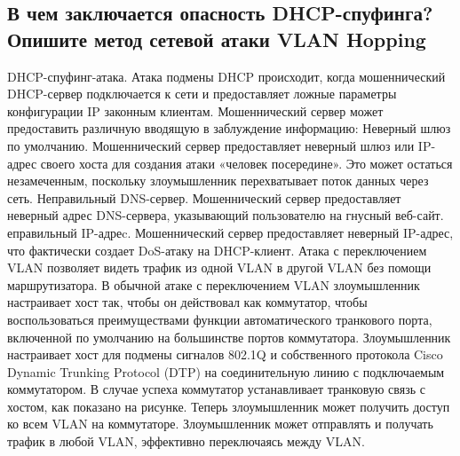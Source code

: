 \subsection{В чем заключается опасность DHCP-спуфинга? Опишите метод сетевой атаки VLAN Hopping}

DHCP-спуфинг-атака.
Атака подмены DHCP происходит, когда мошеннический DHCP-сервер подключается к сети и предоставляет ложные параметры конфигурации IP законным клиентам. Мошеннический сервер может предоставить различную вводящую в заблуждение информацию:
Неверный шлюз по умолчанию. Мошеннический сервер предоставляет неверный шлюз или IP-адрес своего хоста для создания атаки «человек посередине». Это может остаться незамеченным, поскольку злоумышленник перехватывает поток данных через сеть.
Неправильный DNS-сервер. Мошеннический сервер предоставляет неверный адрес DNS-сервера, указывающий пользователю на гнусный веб-сайт.
еправильный IP-адреc. Мошеннический сервер предоставляет неверный IP-адрес, что фактически создает DoS-атаку на DHCP-клиент.
Атака с переключением VLAN позволяет видеть трафик из одной VLAN в другой VLAN без помощи маршрутизатора. В обычной атаке с переключением VLAN злоумышленник настраивает хост так, чтобы он действовал как коммутатор, чтобы воспользоваться преимуществами функции автоматического транкового порта, включенной по умолчанию на большинстве портов коммутатора.
Злоумышленник настраивает хост для подмены сигналов 802.1Q и собственного протокола Cisco Dynamic Trunking Protocol (DTP) на соединительную линию с подключаемым коммутатором. В случае успеха коммутатор устанавливает транковую связь с хостом, как показано на рисунке. Теперь злоумышленник может получить доступ ко всем VLAN на коммутаторе. Злоумышленник может отправлять и получать трафик в любой VLAN, эффективно переключаясь между VLAN.

